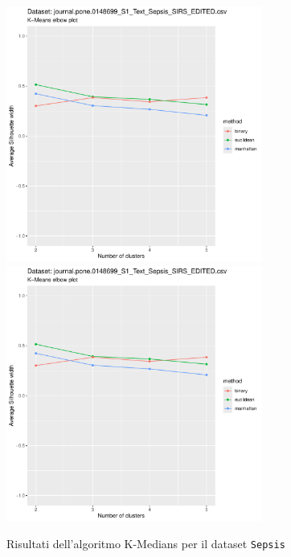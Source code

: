 \documentclass[a4paper, 12pt]{report}
\begin{document}
			\begin{figure}[H]
				\centering
				\includegraphics[width = 0.75\textwidth, height = 0.45\textheight, page = 3]{
					results/results_Sepsis.csv.pdf
				}
				\includegraphics[width = 0.75\textwidth, height = 0.45\textheight, page = 4]{
					results/results_Sepsis.csv.pdf
				}
				\caption{Risultati dell'algoritmo K-Medians per il dataset
				\texttt{Sepsis}}
				\label{fig:kmedians5}
			\end{figure}
\end{document}
